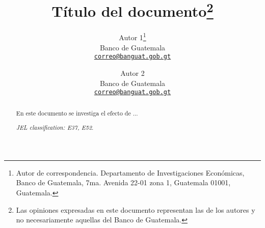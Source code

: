 \documentclass{diereport}
\title{Título del documento\footnote{Las opiniones expresadas en este documento representan las de los autores y no necesariamente aquellas del Banco de Guatemala.}}
\author{
  Autor 1\thanks{Autor de correspondencia. Departamento de Investigaciones Económicas, Banco de Guatemala, 7ma. Avenida 22-01 zona 1, Guatemala 01001, Guatemala.}\\
  {\small Banco de Guatemala
  }\\
  {\footnotesize\href{mailto:correo@banguat.gob.gt}{\texttt{correo@banguat.gob.gt}}}
  \and
  Autor 2\\
  {\small Banco de Guatemala}\\
  {\footnotesize\href{mailto:correo@banguat.gob.gt}{\texttt{correo@banguat.gob.gt}}}
}
\begin{document}
	
	\maketitle

	
	\begin{abstract}
	En este documento se investiga el efecto de ...

	\noindent \textit{JEL classification: E37, E52}.
	\end{abstract}
	
	

	

	
	
	
	
	
		
	

	\printbibliography
	
	\newpage
	
\end{document}
